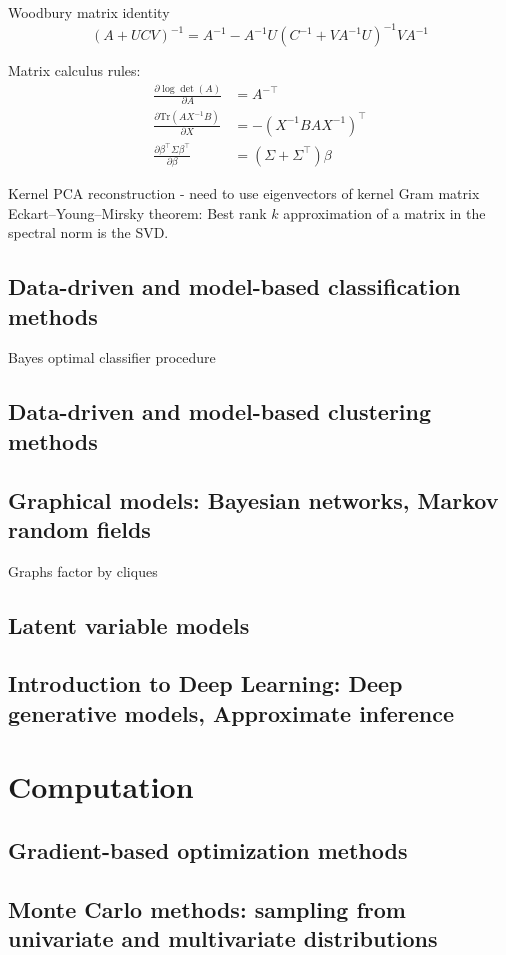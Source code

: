 \documentclass{article}
\begin{document}
Woodbury matrix identity
\[ (A + UCV)^{-1} = A^{-1} - A^{-1}U(C^{-1} + VA^{-1}U)^{-1}VA^{-1} \]

Matrix calculus rules:
\begin{align*}
  \frac{\partial \log \det (A)}{\partial A} &= A^{-\top} \\
  \frac{\partial \text{Tr}(AX^{-1}B) }{\partial X} &= -(X^{-1}BAX^{-1})^\top \\
  \frac{\partial \beta^{\top} \Sigma \beta^{\top}}{\partial \beta} &= (\Sigma + \Sigma^\top)\beta
\end{align*}

Kernel PCA reconstruction - need to use eigenvectors of kernel Gram matrix \\

Eckart–Young–Mirsky theorem: Best rank $k$ approximation of a matrix in the spectral norm is the SVD.
\subsection{Data-driven and model-based classification methods}
Bayes optimal classifier procedure

\subsection{Data-driven and model-based clustering methods}
\subsection{Graphical models: Bayesian networks, Markov random fields}
Graphs factor by cliques

\subsection{Latent variable models}
\subsection{Introduction to Deep Learning: Deep generative models, Approximate inference}

\section{Computation}
\subsection{Gradient-based optimization methods}
\subsection{Monte Carlo methods: sampling from univariate and multivariate distributions}
\end{document}
